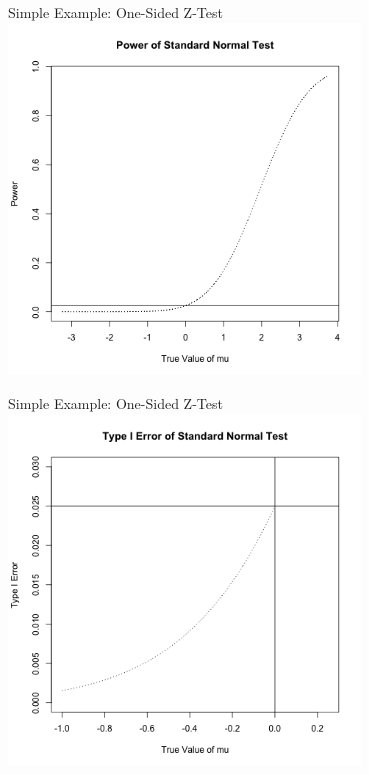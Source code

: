 \begin{frame}{Simple Example: One-Sided Z-Test}
\centering
\includegraphics[width=0.7\textwidth]{figures/z-test-1.png}
\end{frame}

\begin{frame}{Simple Example: One-Sided Z-Test}
\centering
\includegraphics[width=0.7\textwidth]{figures/z-test-2.png}
\end{frame}

